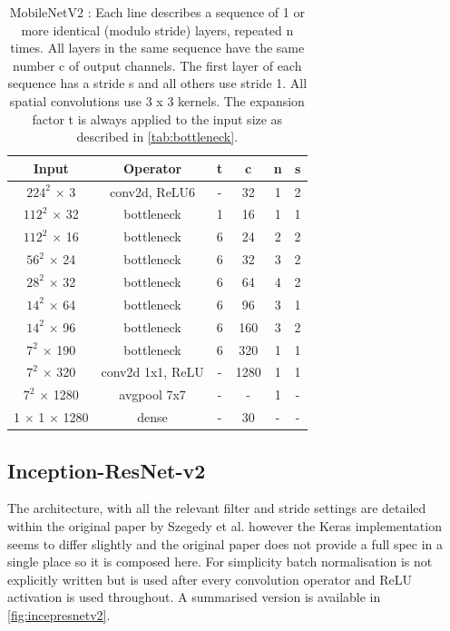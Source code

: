 \documentclass[12pt]{article}
\numberwithin{equation}{section}
\numberwithin{figure}{section}
\begin{document}
\begin{table}[]
	\centering
	\begin{tabular}{c|c|c|c|c|c}
	\hline
	\textbf{Input}         & \textbf{Operator} & \textbf{t} & \textbf{c} & \textbf{n} & \textbf{s} \\ \hline \hline
	$224^2$ $\times$ 3         & conv2d, ReLU6           & -          & 32         & 1          & 2          \\
	$112^2$ $\times$ 32        & bottleneck        & 1          & 16         & 1          & 1          \\
	$112^2$ $\times$ 16        & bottleneck        & 6          & 24         & 2          & 2          \\
	$56^2$ $\times$ 24         & bottleneck        & 6          & 32         & 3          & 2          \\
	$28^2$ $\times$ 32         & bottleneck        & 6          & 64         & 4          & 2          \\
	$14^2$ $\times$ 64         & bottleneck        & 6          & 96         & 3          & 1          \\
	$14^2$ $\times$ 96         & bottleneck        & 6          & 160        & 3          & 2          \\
	$7^2$ $\times$ 190         & bottleneck        & 6          & 320        & 1          & 1          \\
	$7^2$ $\times$ 320         & conv2d 1x1, ReLU        & -          & 1280       & 1          & 1          \\
	$7^2$ $\times$ 1280        & avgpool 7x7       & -          & -          & 1          & -          \\
	1 $\times$ 1 $\times$ 1280 & dense             & -          & 30         & -          & -          \\ \hline
	\end{tabular}%
	\caption{MobileNetV2 : Each line describes a sequence of 1 or more identical (modulo stride) layers, repeated n times. All layers in the same sequence have the same number c of output channels. The first layer of each sequence has a stride s and all others use stride 1. All
	spatial convolutions use 3 x 3 kernels. The expansion factor t is always applied to the input size as described in \cref{tab:bottleneck}.
	}
	\label{tab:mobilenetv2_arch}
	\end{table}

\subsection{Inception-ResNet-v2} 
\label{sub:Inception-ResnetV2} 
The architecture, with all the relevant filter and stride settings are detailed within the original paper by Szegedy et al. \cite{Szegedy2016} however the Keras implementation seems to differ slightly and the original paper does not provide a full spec in a single place so it is composed here. For simplicity batch normalisation is not explicitly written but is used after every convolution operator and ReLU activation is used throughout. A summarised version is available in \cref{fig:incepresnetv2}\cite{Alemi2016}.
\end{document}

